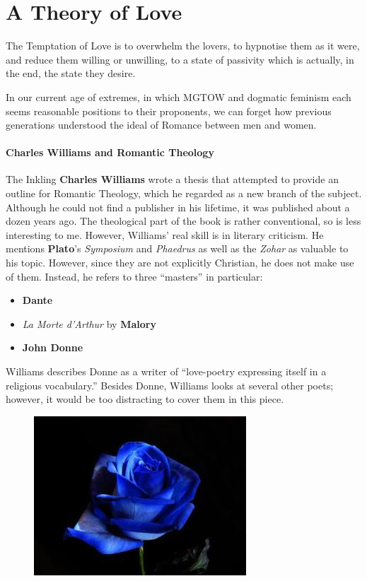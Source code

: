\section{A Theory of Love}

\begin{quotex}
The Temptation of Love is to overwhelm the lovers, to hypnotise them as it were, and reduce them willing or unwilling, to a state of passivity which is actually, in the end, the state they desire. 

\end{quotex}

In our current age of extremes, in which MGTOW and dogmatic feminism each seems reasonable positions to their proponents, we can forget how previous generations understood the ideal of Romance between men and women.

\paragraph{Charles Williams and Romantic Theology}
The Inkling \textbf{Charles Williams} wrote a thesis that attempted to provide an outline for Romantic Theology, which he regarded as a new branch of the subject. Although he could not find a publisher in his lifetime, it was published about a dozen years ago. The theological part of the book is rather conventional, so is less interesting to me. However, Williams' real skill is in literary criticism. He mentions \textbf{Plato}'s \emph{Symposium} and \emph{Phaedrus} as well as the \emph{Zohar} as valuable to his topic. However, since they are not explicitly Christian, he does not make use of them. Instead, he refers to three “masters” in particular:

\begin{itemize}
\item \textbf{Dante} 
\item \emph{La Morte d'Arthur} by \textbf{Malory} 
\item \textbf{John Donne} 
\end{itemize}
Williams describes Donne as a writer of “love-poetry expressing itself in a religious vocabulary.” Besides Donne, Williams looks at several other poets; however, it would be too distracting to cover them in this piece.

\begin{figure}
	\centering
	\includegraphics[scale=.3]{a20190131ATheoryofLove-img001.jpg} 
\end{figure}

